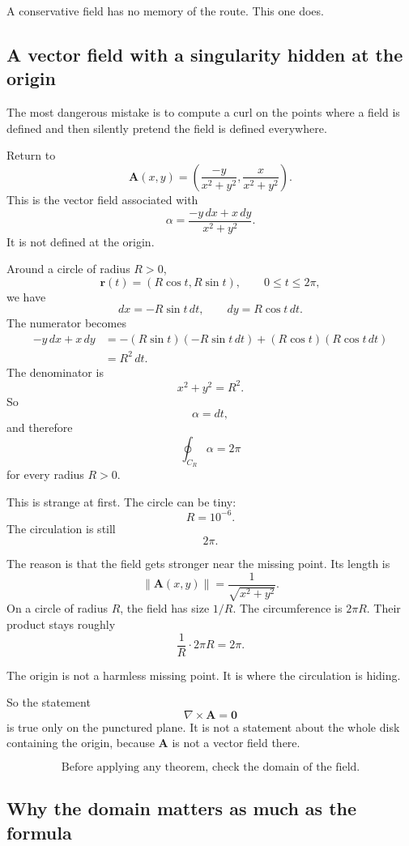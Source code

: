 A conservative field has no memory of the route.  This one does.

\subsection{A vector field with a singularity hidden at the origin}

The most dangerous mistake is to compute a curl on the points where a field is defined
and then silently pretend the field is defined everywhere.

Return to
\[
    \mathbf A(x,y)=
    \left(
        \frac{-y}{x^2+y^2},
        \frac{x}{x^2+y^2}
    \right).
\]
This is the vector field associated with
\[
    \alpha=\frac{-y\,dx+x\,dy}{x^2+y^2}.
\]
It is not defined at the origin.

Around a circle of radius \(R>0\),
\[
    \mathbf r(t)=(R\cos t,R\sin t),
    \qquad 0\le t\le2\pi,
\]
we have
\[
    dx=-R\sin t\,dt,
    \qquad
    dy=R\cos t\,dt.
\]
The numerator becomes
\[
\begin{aligned}
-y\,dx+x\,dy
&=
-(R\sin t)(-R\sin t\,dt)+(R\cos t)(R\cos t\,dt)\\
&=
R^2\,dt.
\end{aligned}
\]
The denominator is
\[
    x^2+y^2=R^2.
\]
So
\[
    \alpha=dt,
\]
and therefore
\[
\boxed{
    \oint_{C_R}\alpha=2\pi
}
\]
for every radius \(R>0\).

This is strange at first.  The circle can be tiny:
\[
    R=10^{-6}.
\]
The circulation is still
\[
    2\pi.
\]

The reason is that the field gets stronger near the missing point.  Its length is
\[
    \|\mathbf A(x,y)\|
    =
    \frac{1}{\sqrt{x^2+y^2}}.
\]
On a circle of radius \(R\), the field has size \(1/R\).  The circumference is \(2\pi R\).
Their product stays roughly
\[
    \frac1R\cdot 2\pi R=2\pi.
\]

The origin is not a harmless missing point.  It is where the circulation is hiding.

So the statement
\[
    \nabla\times\mathbf A=\mathbf 0
\]
is true only on the punctured plane.  It is not a statement about the whole disk
containing the origin, because \(\mathbf A\) is not a vector field there.

\[
\boxed{
    \text{Before applying any theorem, check the domain of the field.}
}
\]

\subsection{Why the domain matters as much as the formula}

